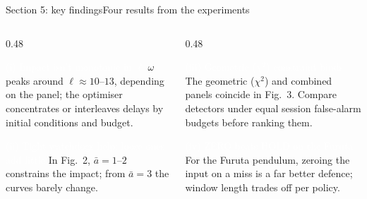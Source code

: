 \documentclass[8pt,aspectratio=169]{beamer}
\gdef\CPSOrigin{PAPER}%
\gdef\CPSSourceContext{}%
\begin{document}
\begin{frame}{Section 5: key findings}{Four results from the experiments}
\gdef\CPSSourceContext{}
\gdef\CPSOrigin{PAPER}
  \begin{columns}[T]
    \begin{column}{0.48\textwidth}
      \begin{block}{\textcolor{white}{(i) Impact isn't monotonic in $\ell$}}
        $\omega$ peaks around $\ell \approx 10$--$13$, depending on the panel; the optimiser concentrates or interleaves delays by initial conditions and budget.
      \end{block}
      \begin{block}{\textcolor{white}{(ii) Tight watchdogs help; loose ones add little}}
        In Fig.~2, $\bar a=1$--$2$ constrains the impact; from $\bar a=3$ the curves barely change.
      \end{block}
    \end{column}
    \begin{column}{0.48\textwidth}
      \begin{block}{\textcolor{white}{(iii) Geometric ($\chi^2$) constraint binds}}
        The geometric ($\chi^2$) and combined panels coincide in Fig.~3. Compare detectors under equal session false-alarm budgets before ranking them.
      \end{block}
      \begin{block}{\textcolor{white}{(iv) ZERO beats HOLD on the Furuta}}
        For the Furuta pendulum, zeroing the input on a miss is a far better defence; window length trades off per policy.
      \end{block}
    \end{column}
  \end{columns}
\end{frame}
\end{document}
